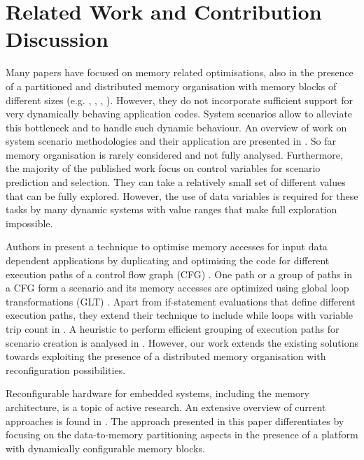\section{Related Work and Contribution Discussion}
\label{sec:related}

Many papers have focused on memory related optimisations, also in the presence of a partitioned and distributed memory organisation with memory blocks of different sizes (e.g. \cite{Ben00b}, \cite{Ben00c}, \cite{Mac02}, \cite{Pgk01}). However, they do not incorporate sufficient support for very dynamically behaving application codes. System scenarios allow to alleviate this bottleneck and to handle such dynamic behaviour. An overview of work on system scenario methodologies and their application are presented in \cite{Gheorghita2007}. So far memory organisation is rarely considered and not fully analysed. Furthermore, the majority of the published work focus on control variables for scenario prediction and selection. They can take a relatively small set of different values that can be fully explored. However, the use of data variables \cite{Elena2010} is required for these tasks by many dynamic systems with value ranges that make full exploration impossible. 

Authors in \cite{Pal06} present a technique to optimise memory accesses for input data dependent applications by duplicating and optimising the code for different execution paths of a control flow graph (CFG) . One path or a group of paths in a CFG form a scenario and its memory accesses are optimized using global loop transformations (GLT) . Apart from if-statement evaluations that define different execution paths, they extend their technique to include while loops with variable trip count in \cite{Pal06b}. A heuristic to perform efficient grouping of execution paths for scenario creation is analysed in \cite{Pal07}. However, our work extends the existing solutions towards exploiting the presence of a distributed memory organisation with reconfiguration possibilities.

Reconfigurable hardware for embedded systems, including the memory architecture, is a topic of active research. An extensive overview of current approaches is found in \cite{Garcia}. The approach presented in this paper differentiates by focusing on the data-to-memory partitioning aspects in the presence of a platform with dynamically configurable memory blocks. 

